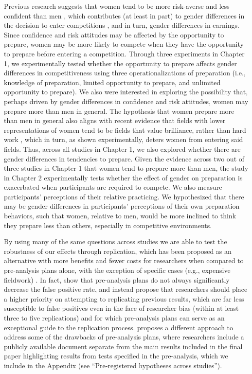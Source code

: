 \documentclass[letterpaper, nobind]{templates/ociamthesis}
\begin{document}
Previous research suggests that women tend to be more risk-averse \autocite{Croson2009,Dohmen2011b,Eckel2008,Bertrand2010a} and less confident than men \autocite{Bertrand2010,Lundeberg1994,Mobius2011,Barber2001,Croson2009}, which contributes (at least in part) to gender differences in the decision to enter competitions \autocite{Veldhuizen2017,Gillen2019,Niederle2011}, and in turn, gender differences in earnings. Since confidence and risk attitudes may be affected by the opportunity to prepare, women may be more likely to compete when they have the opportunity to prepare before entering a competition. Through three experiments in Chapter 1, we experimentally tested whether the opportunity to prepare affects gender differences in competitiveness using three operationalizations of preparation (i.e., knowledge of preparation, limited opportunity to prepare, and unlimited opportunity to prepare). We also were interested in exploring the possibility that, perhaps driven by gender differences in confidence and risk attitudes, women may prepare more than men in general. The hypothesis that women prepare more than men in general also aligns with recent evidence that fields with lower representations of women tend to be fields that value brilliance, rather than hard work \autocite{Bian2017a,Bian2017,Leslie2015,Meyer2015}, which in turn, as shown experimentally, deters women from entering said fields. Thus, across all studies in Chapter 1, we also explored whether there are gender differences in tendencies to prepare. Given the evidence across two out of three studies in Chapter 1 that women tend to prepare more than men, the study in Chapter 2 experimentally tests whether the effect of gender on preparation is exacerbated when participants are required to compete. We also measure participants' perceptions of their relative practicing. We hypothesized that there may be gender differences in participants' perceptions of their own preparation behaviors, such that women, relative to men, would be more inclined to think they prepare less than others, especially in competitive environments.

By using many of the same questions across studies we are able to test the robustness of our effects through replication, which has been proposed as an alternative with more benefits and fewer costs for researchers when compared to pre-analysis plans alone, with the exception of specific cases (e.g., expensive fieldwork) \autocite{Coffman2015}. In fact, \textcite{Coffman2015} show that pre-analysis plans do not always significantly decrease the false positive rate, and instead propose that researchers should place a higher priority on attempting to replicating previous results, which are far less susceptible to false positives even in the face of researcher bias (within at least three to five replications) and for which pre-analysis plans can serve as an exceptional guide to the replication process. \textcite{Banerjee2020} proposes a different approach to address some of the drawbacks of pre-analysis plans, where researchers include a publicly available document separate from the main results included in the final paper highlighting results from tests specified in the pre-analysis, which we include in the Appendix (see ``Pre-registered hypotheses across studies'').
\end{document}
